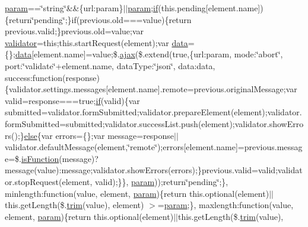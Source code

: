 \begin{DoxyCompactItemize}
\hyperlink{packages_2j_query_81_810_82_2_content_2_scripts_2jquery-1_810_82_8min_8js_ae8915303d11557d1b001bc56b6195251}{param}==\char`\"{}string\char`\"{}\&\&\{url\+:param\}$\vert$$\vert$\hyperlink{packages_2j_query_81_810_82_2_content_2_scripts_2jquery-1_810_82_8min_8js_ae8915303d11557d1b001bc56b6195251}{param};\hyperlink{packages_2_respond_81_82_80_2content_2_scripts_2respond_8min_8js_a93851d60dd037a83509a1757b9ee7b66}{if}(this.\+pending\mbox{[}element.\+name\mbox{]})\{return\char`\"{}pending\char`\"{};\}if(previous.\+old===value)\{return previous.\+valid;\}previous.\+old=value;var \hyperlink{packages_2j_query_8_validation_81_811_81_2_content_2_scripts_2jquery_8validate_8js_a2dc8272bb221cdffcccbd20db038f172}{validator}=this;this.\+start\+Request(element);var \hyperlink{jquery-1_810_82-vsdoc_8js_a609407b3456fdc3c5671a9fc4a226ff7}{data}=\{\};\hyperlink{jquery-1_810_82-vsdoc_8js_a609407b3456fdc3c5671a9fc4a226ff7}{data}\mbox{[}element.\+name\mbox{]}=value;\$.\hyperlink{packages_2j_query_8_validation_81_811_81_2_content_2_scripts_2jquery_8validate_8js_a77004c0fdc08a5bc07afa0b099cdf6df}{ajax}(\$.extend(true,\{url\+:param, mode\+:\char`\"{}abort\char`\"{}, port\+:\char`\"{}validate\char`\"{}+element.\+name, data\+Type\+:\char`\"{}json\char`\"{}, data\+:data, success\+:function(response)\{validator.\+settings.\+messages\mbox{[}element.\+name\mbox{]}.remote=previous.\+original\+Message;var valid=response===true;\hyperlink{packages_2_respond_81_82_80_2content_2_scripts_2respond_8min_8js_a93851d60dd037a83509a1757b9ee7b66}{if}(valid)\{var submitted=validator.\+form\+Submitted;validator.\+prepare\+Element(element);validator.\+form\+Submitted=submitted;validator.\+success\+List.\+push(element);validator.\+show\+Errors();\}\hyperlink{packages_2j_query_8_validation_81_811_81_2_content_2_scripts_2jquery_8validate_8js_a0544c3fe466e421738dae463968b70ba}{else}\{var errors=\{\};var message=response$\vert$$\vert$validator.\+default\+Message(element,\char`\"{}remote\char`\"{});errors\mbox{[}element.\+name\mbox{]}=previous.\+message=\$.\hyperlink{jquery-1_810_82-vsdoc_8js_a02aa8413df0c687cbb1cd77943741d5a}{is\+Function}(message)?message(value)\+:message;validator.\+show\+Errors(errors);\}previous.\+valid=valid;validator.\+stop\+Request(element, valid);\}\}, \hyperlink{packages_2j_query_81_810_82_2_content_2_scripts_2jquery-1_810_82_8min_8js_ae8915303d11557d1b001bc56b6195251}{param}));return\char`\"{}pending\char`\"{};\}, minlength\+:function(value, element, \hyperlink{packages_2j_query_81_810_82_2_content_2_scripts_2jquery-1_810_82_8min_8js_ae8915303d11557d1b001bc56b6195251}{param})\{return this.\+optional(element)$\vert$$\vert$this.\+get\+Length(\$.\hyperlink{jquery-1_810_82-vsdoc_8js_a5c6bdf61ecee84c4d51137801d3fac85}{trim}(value), element) $>$=\hyperlink{packages_2j_query_81_810_82_2_content_2_scripts_2jquery-1_810_82_8min_8js_ae8915303d11557d1b001bc56b6195251}{param};\}, maxlength\+:function(value, element, \hyperlink{packages_2j_query_81_810_82_2_content_2_scripts_2jquery-1_810_82_8min_8js_ae8915303d11557d1b001bc56b6195251}{param})\{return this.\+optional(element)$\vert$$\vert$this.\+get\+Length(\$.\hyperlink{jquery-1_810_82-vsdoc_8js_a5c6bdf61ecee84c4d51137801d3fac85}{trim}(value), 
\end{DoxyCompactItemize}

